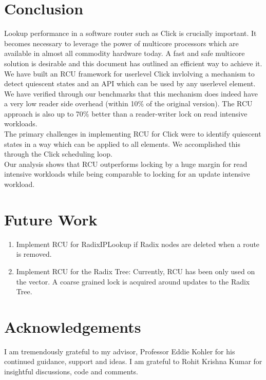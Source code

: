 \documentclass{article}
\begin{document}
\section{Conclusion}
Lookup performance in a software router such as Click is crucially
important. It becomes necessary to leverage the power of multicore
processors which are available in almost all commodity hardware
today. A fast and safe multicore solution is desirable and this
document has outlined an efficient way to achieve it.\\

We have built an RCU framework for userlevel Click invlolving a
mechanism to detect quiescent states and an API which can be used by
any userlevel element. We have verified through our benchmarks that
this mechanism does indeed have a very low reader side overhead
(within 10\% of the original version). The RCU approach is also up to
70\% better than a reader-writer lock on read intensive workloads.\\

The primary challenges in implementing RCU for Click were to
identify quiescent states in a way which can be applied to all
elements. We accomplished this through the Click scheduling loop.\\

Our analysis shows that RCU outperforms locking by a huge margin
for read intensive workloads while being comparable to locking for an
update intensive workload.
\section{Future Work}
\begin{enumerate}
\item Implement RCU for RadixIPLookup if Radix nodes are deleted when a route is removed.
\item Implement RCU for the Radix Tree: Currently, RCU has been only used on the vector. A coarse grained lock is acquired around updates to the Radix Tree.
\end{enumerate}
\section{Acknowledgements}
I am tremendously grateful to my advisor, Professor Eddie Kohler for his continued guidance, support and ideas.
I am grateful to Rohit Krishna Kumar for insightful discussions, code and comments.


\end{document}
